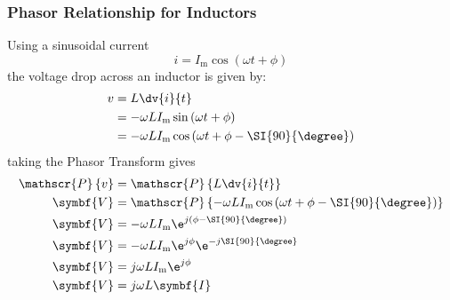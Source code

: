\documentclass{article}
\begin{document}
\subsubsection{Phasor Relationship for Inductors}
Using a sinusoidal current
\begin{equation*}
    i = I_{\mathrm{m}}\cos{\left( \omega t + \phi \right)}
\end{equation*}
the voltage drop across an inductor is given by:
\begin{align*}
    v & = L \dv{i}{t}                                                                      \\
      & = -\omega L I_{\mathrm{m}} \sin{\left( \omega t + \phi \right)}                    \\
      & = -\omega L I_{\mathrm{m}} \cos{\left( \omega t + \phi - \SI{90}{\degree} \right)}
\end{align*}
taking the Phasor Transform gives
\begin{align*}
    \mathscr{P}\left\{ v \right\} & = \mathscr{P}\left\{ L \dv{i}{t} \right\}                                                                      \\
    \symbf{V}                     & = \mathscr{P}\left\{ -\omega L I_{\mathrm{m}} \cos{\left( \omega t + \phi - \SI{90}{\degree} \right)} \right\} \\
    \symbf{V}                     & = -\omega L I_{\mathrm{m}} \e^{j\left( \phi - \SI{90}{\degree} \right)}                                        \\
    \symbf{V}                     & = -\omega L I_{\mathrm{m}} \e^{j \phi} \e^{-j\SI{90}{\degree}}                                                 \\
    \symbf{V}                     & = j\omega L I_{\mathrm{m}} \e^{j \phi}                                                                         \\
    \symbf{V}                     & = j\omega L \symbf{I}
\end{align*}
\end{document}
